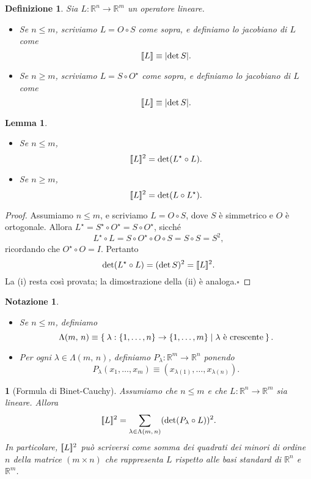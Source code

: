 \documentclass[a4paper,10pt,openright,oneside]{book}
\theoremstyle{theoremstyle}
\newtheorem{lemma}[teorema]{Lemma}
\theoremstyle{theoremstylewoheader}
\newtheorem{teorema2}[teorema]{}
\theoremstyle{theoremstyle}
\newtheorem{definizione}[teorema]{Definizione}
\newtheorem{notazione}[teorema]{Notazione}
\theoremstyle{proofsecstyle}
\theoremstyle{nonumberplain}
\newtheorem{proof}{Dim.}
\newcommand{\RR}{\ensuremath{\mathbb{R}}}
\newcommand{\abs}[1]{\ensuremath{\lvert #1 \rvert}}
\newcommand{\jacobian}[1]{\ensuremath{[\kern-1.7pt[#1]\kern-1.7pt]}}
\renewcommand{\qedsymbol}{\ensuremath{\square}}
\newcommand{\qed}{\unskip\nobreak\hfill\nobreak\hspace{.5em}\qedsymbol}
\begin{document}
\begin{definizione}
Sia $L : \RR^n \rightarrow \RR^m$ un operatore lineare.
\begin{itemize}
\item[(i)] Se $n \le m$, scriviamo $L = O \circ S$ come sopra, e definiamo lo \emph{jacobiano} di $L$ come
\[
\jacobian{L} \equiv \abs{\det S}.
\]
\item[(ii)] Se $n \ge m$, scriviamo $L = S \circ O^\star$ come sopra, e definiamo lo \emph{jacobiano} di $L$ come
\[
\jacobian{L} \equiv \abs{\det S}.
\]
\end{itemize}
\end{definizione}

\begin{lemma}
\label{pro:unicita_jacobiano}
\mbox{}
\begin{itemize}
\item[(i)] Se $n \le m$,
\[
\jacobian{L}^2 = \det(L^\star \circ L).
\]
\item[(ii)] Se $n \ge m$,
\[
\jacobian{L}^2 = \det(L \circ L^\star).
\]
\end{itemize}
\end{lemma}

\begin{proof}
Assumiamo $n \le m$, e scriviamo $L = O \circ S$, dove $S$ è simmetrico e $O$ è ortogonale. Allora $L^\star = S^\star \circ O^\star = S \circ O^\star$, sicché
\[
L^\star \circ L = S \circ O^\star \circ O \circ S = S \circ S = S^2,
\]
ricordando che $O^\star \circ O = I$. Pertanto
\[
\det (L^\star \circ L) = (\det S)^2 = \jacobian{L}^2.
\]
La (i) resta così provata; la dimostrazione della (ii) è analoga.\qed
\end{proof}

\begin{notazione}
\mbox{}
\begin{itemize}
\item[(i)] Se $n \le m$, definiamo
\[
\Lambda(m,\, n) \equiv \Set{ \lambda : \{1, \ldots, n\} \rightarrow \{1, \ldots, m\} | \text{$\lambda$ è crescente} }.
\]
\item[(ii)] Per ogni $\lambda \in \Lambda(m,\, n)$, definiamo $P_\lambda : \RR^m \rightarrow \RR^n$ ponendo
\[
P_\lambda(x_1, \ldots, x_m) \equiv (x_{\lambda(1)}, \ldots, x_{\lambda(n)}).
\]
\end{itemize}
\end{notazione}

\begin{teorema2}[Formula di Binet-Cauchy]
\label{thm:formula_binet_cauchy}
Assumiamo che $n \le m$ e che $L : \RR^n \rightarrow \RR^m$ sia lineare. Allora
\[
\jacobian{L}^2 = \sum_{\lambda \in \Lambda(m,\, n)} (\det(P_\lambda \circ L))^2.
\]
In particolare, $\jacobian{L}^2$ può scriversi come somma dei quadrati dei minori di ordine $n$ della matrice $(m \times n)$ che rappresenta $L$ rispetto alle basi standard di $\RR^n$ e $\RR^m$.
\end{teorema2}
\end{document}
